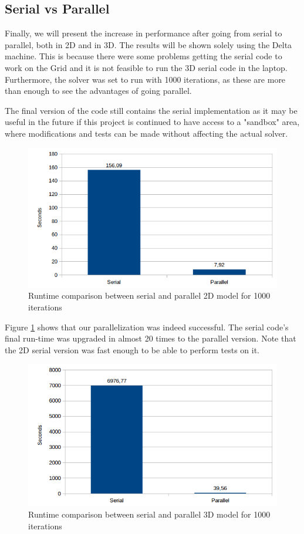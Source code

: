 \documentclass[12pt, openany]{book}
\begin{document}
\subsection{Serial vs Parallel}
Finally, we will present the increase in performance after going from serial to parallel, both in 2D and in 3D. The results will be shown solely using the Delta machine. This is because there were some problems getting the serial code to work on the Grid and it is not feasible to run the 3D serial code in the laptop. Furthermore, the solver was set to run with 1000 iterations, as these are more than enough to see the advantages of going parallel. \par 
The final version of the code still contains the serial implementation as it may be useful in the future if this project is continued to have access to a "sandbox" area, where modifications and tests can be made without affecting the actual solver.

  \begin{figure}[H]
  	\centering
  	\includegraphics[width=\linewidth]{Resources/Images/serialDelta.png}
  	\caption{Runtime comparison between serial and parallel 2D model for 1000 iterations}
  	\label{fig:serial}
  \end{figure}
  
  Figure \ref{fig:serial} shows that our parallelization was indeed successful. The serial code's final run-time was upgraded in almost 20 times to the parallel version. Note that the 2D serial version was fast enough to be able to perform tests on it.
  
    \begin{figure}[H]
    	\centering
    	\includegraphics[width=0.8\linewidth]{Resources/Images/serialDelta3D.png}
    	\caption{Runtime comparison between serial and parallel 3D model for 1000 iterations}
    	\label{fig:serial3d}
    \end{figure}
    
\end{document}
